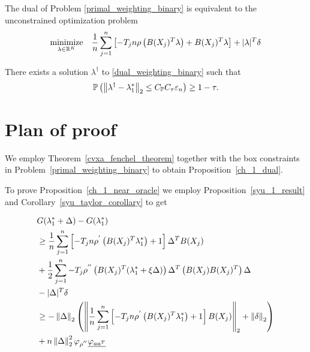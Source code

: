 \begin{proposition}
  \label{ch_1_dual}
  The dual of Problem \eqref{primal_weighting_binary} is equivalent to the unconstrained optimization problem
  \begin{gather}
    \label{dual_weighting_binary}
      \underset{\lambda \in \mathbb{R}^K}{\text{minimize}}
      \quad
      \frac{1}{n}
      \sum_{j = 1}^{n} 
      \left[ 
        -T_j n 
        \rho 
        \left( 
          B(X_j)^T \lambda
        \right)
      +
      B(X_j)^T \lambda
      \right]
      +
      |\lambda|^T \delta
  \end{gather}
\end{proposition}


\begin{proposition}
  \label{ch_1_near_oracle}
  There exists a solution $\lambda^\dagger$ 
  to \eqref{dual_weighting_binary}
  such that
  \begin{gather}
    \mathbb{P}
    \left( 
      \left\lVert
        \lambda^\dagger
        -
        \lambda^*_1
      \right\rVert_2
      \le
      C_{\mathbb{P}} C_\tau \varepsilon_n
    \right)
    \ge 
    1 - \tau
    .
  \end{gather}
\end{proposition}


\section{Plan of proof}
We employ 
Theorem~\ref{cvxa_fenchel_theorem}
together with the box constraints in Problem~\eqref{primal_weighting_binary}
to obtain Proposition~\ref{ch_1_dual}.

To prove Proposition~\ref{ch_1_near_oracle}
we employ
Proposition~\ref{syu_1_result}
and 
Corollary~\ref{syu_taylor_corollary}
to get

\begin{align}
  \begin{split}
  & 
  G(\lambda^*_1 + \Delta) 
  -
  G(\lambda^*_1)
  \\
  &\ge
      \frac{1}{n}
      \sum_{j = 1}^{n} 
      \left[ 
        -T_j n 
        \rho^{'} 
        \left( 
          B(X_j)^T \lambda^*_1
        \right)
      +
      1
      \right]
      \Delta^T B(X_j)
      \\
  & +
      \frac{1}{2}
      \sum_{j = 1}^{n} 
        -T_j  
        \rho^{''} 
        \left( 
          B(X_j)^T (\lambda^*_1 + \xi \Delta)
        \right)
        \Delta^T
        \left( 
          B(X_j)
          B(X_j)^T
        \right)
        \Delta
        \\
  &-
      |\Delta|^T \delta
  \\
  &\ge
    - \left\lVert\Delta\right\rVert_2
    \left( 
    \left\lVert
      \frac{1}{n}
      \sum_{j = 1}^{n} 
      \left[ 
        -T_j n 
        \rho^{'} 
        \left( 
          B(X_j)^T \lambda^*_1
        \right)
      +
      1
      \right]
      B(X_j)
    \right\rVert_2
    +
    \left\lVert\delta\right\rVert_2
    \right)
    \\
  &+
  n
  \left\lVert\Delta\right\rVert^2_2
   \varphi_{\rho^{''}}
  \underline{\varphi_{aa^T}}
  \end{split}
\end{align}

